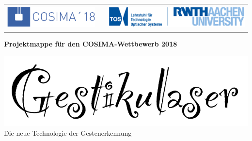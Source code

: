 
\begin{titlepage}

    
	\begin{table}[h!]
		\begin{tabular}{rp{5cm}l}
 		\includegraphics[height=1.25cm]{../Logos/Cosima18.png} & & \includegraphics[height=1.25cm]{../Logos/TOS.png} \\
		\end{tabular}
	\end{table}
    
    \small
	\parindent0pt
	
	\begin{center}
		\bfseries Projektmappe für den COSIMA-Wettbewerb 2018
	\end{center}
	
	\vspace*{15mm}
	\normalsize	
	
	\begin{center}
		\includegraphics[scale=0.35]{../Logos/GestikulaserSchriftzugOhneHut.png}
		\\ \vspace*{4mm}
		\large
		Die neue Technologie der Gestenerkennung
	\end{center}
	
	\vfill
	
	\begin{center}
	\large \mydate{\today}
	\end{center}
	

\end{titlepage}

